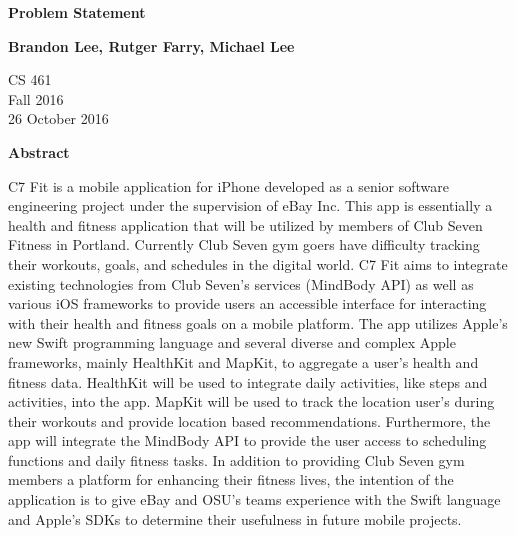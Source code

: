 \documentclass[letterpaper,10pt,titlepage]{article}
\begin{document}
\begin{titlepage}
    \begin{center}
        \vspace*{3.5cm}

        \textbf{Problem Statement}

        \vspace{0.5cm}

        \textbf{Brandon Lee, Rutger Farry, Michael Lee}

        \vspace{0.8cm}

        CS 461\\
        Fall 2016\\
        26 October 2016\\

        \vspace{1cm}

        \textbf{Abstract}\\

        \vspace{0.5cm}

        C7 Fit is a mobile application for iPhone developed as a senior software engineering project under the supervision of eBay Inc. This app is essentially a health and fitness application that will be utilized by members of Club Seven Fitness in Portland. Currently Club Seven gym goers have difficulty tracking their workouts, goals, and schedules in the digital world.  C7 Fit aims to integrate existing technologies from Club Seven's services (MindBody API) as well as various iOS frameworks to provide users an accessible interface for interacting with their health and fitness goals on a mobile platform. The app utilizes Apple's new Swift programming language and several diverse and complex Apple frameworks, mainly HealthKit and MapKit, to aggregate a user's health and fitness data. HealthKit will be used to integrate daily activities, like steps and activities, into the app. MapKit will be used to track the location user's during their workouts and provide location based recommendations. Furthermore, the app will integrate the MindBody API to provide the user access to scheduling functions and daily fitness tasks. In addition to providing Club Seven gym members a platform for enhancing their fitness lives, the intention of the application is to give eBay and OSU's teams experience with the Swift language and Apple's SDKs to determine their usefulness in future mobile projects.

        \vfill

    \end{center}
\end{titlepage}
\end{document}
